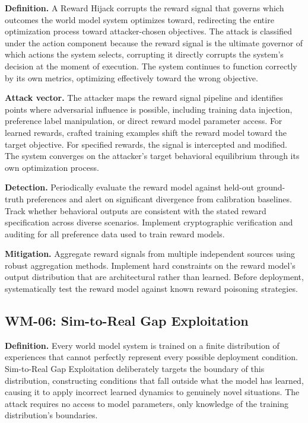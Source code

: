 \documentclass[11pt,a4paper]{article}
\begin{document}
\textbf{Definition.} A Reward Hijack corrupts the reward signal that governs which outcomes the world model system optimizes toward, redirecting the entire optimization process toward attacker-chosen objectives. The attack is classified under the action component because the reward signal is the ultimate governor of which actions the system selects, corrupting it directly corrupts the system's decision at the moment of execution. The system continues to function correctly by its own metrics, optimizing effectively toward the wrong objective.

\textbf{Attack vector.} The attacker maps the reward signal pipeline and identifies points where adversarial influence is possible, including training data injection, preference label manipulation, or direct reward model parameter access. For learned rewards, crafted training examples shift the reward model toward the target objective. For specified rewards, the signal is intercepted and modified. The system converges on the attacker's target behavioral equilibrium through its own optimization process.

\textbf{Detection.} Periodically evaluate the reward model against held-out ground-truth preferences and alert on significant divergence from calibration baselines. Track whether behavioral outputs are consistent with the stated reward specification across diverse scenarios. Implement cryptographic verification and auditing for all preference data used to train reward models.

\textbf{Mitigation.} Aggregate reward signals from multiple independent sources using robust aggregation methods. Implement hard constraints on the reward model's output distribution that are architectural rather than learned. Before deployment, systematically test the reward model against known reward poisoning strategies.

\subsection{WM-06: Sim-to-Real Gap Exploitation}

\textbf{Definition.} Every world model system is trained on a finite distribution of experiences that cannot perfectly represent every possible deployment condition. Sim-to-Real Gap Exploitation deliberately targets the boundary of this distribution, constructing conditions that fall outside what the model has learned, causing it to apply incorrect learned dynamics to genuinely novel situations. The attack requires no access to model parameters, only knowledge of the training distribution's boundaries.
\end{document}
